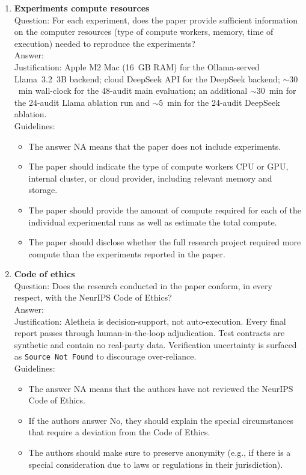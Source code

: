 \documentclass{article}
\begin{document}
\begin{enumerate}
\item {\bf Experiments compute resources}\\
Question: For each experiment, does the paper provide sufficient information on the computer resources (type of compute workers, memory, time of execution) needed to reproduce the experiments?\\
Answer: \answerYes{}\\
Justification: Apple M2 Mac (16~GB RAM) for the Ollama-served Llama~3.2~3B backend; cloud DeepSeek API for the DeepSeek backend; ${\sim}30$~min wall-clock for the 48-audit main evaluation; an additional ${\sim}30$~min for the 24-audit Llama ablation run and ${\sim}5$~min for the 24-audit DeepSeek ablation.\\
Guidelines:
\begin{itemize}
\item The answer NA means that the paper does not include experiments.
\item The paper should indicate the type of compute workers CPU or GPU, internal cluster, or cloud provider, including relevant memory and storage.
\item The paper should provide the amount of compute required for each of the individual experimental runs as well as estimate the total compute.
\item The paper should disclose whether the full research project required more compute than the experiments reported in the paper.
\end{itemize}

\item {\bf Code of ethics}\\
Question: Does the research conducted in the paper conform, in every respect, with the NeurIPS Code of Ethics?\\
Answer: \answerYes{}\\
Justification: Aletheia is decision-support, not auto-execution. Every final report passes through human-in-the-loop adjudication. Test contracts are synthetic and contain no real-party data. Verification uncertainty is surfaced as \texttt{Source Not Found} to discourage over-reliance.\\
Guidelines:
\begin{itemize}
\item The answer NA means that the authors have not reviewed the NeurIPS Code of Ethics.
\item If the authors answer No, they should explain the special circumstances that require a deviation from the Code of Ethics.
\item The authors should make sure to preserve anonymity (e.g., if there is a special consideration due to laws or regulations in their jurisdiction).
\end{itemize}


\end{enumerate}
\end{document}

